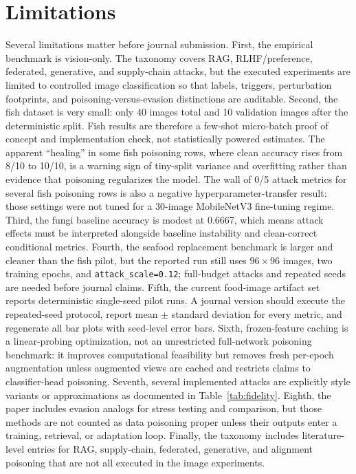 \documentclass[conference]{IEEEtran}
\begin{document}
\section{Limitations}

Several limitations matter before journal submission. First, the empirical benchmark is vision-only. The taxonomy covers RAG, RLHF/preference, federated, generative, and supply-chain attacks, but the executed experiments are limited to controlled image classification so that labels, triggers, perturbation footprints, and poisoning-versus-evasion distinctions are auditable. Second, the fish dataset is very small: only 40 images total and 10 validation images after the deterministic split. Fish results are therefore a few-shot micro-batch proof of concept and implementation check, not statistically powered estimates. The apparent ``healing'' in some fish poisoning rows, where clean accuracy rises from 8/10 to 10/10, is a warning sign of tiny-split variance and overfitting rather than evidence that poisoning regularizes the model. The wall of 0/5 attack metrics for several fish poisoning rows is also a negative hyperparameter-transfer result: those settings were not tuned for a 30-image MobileNetV3 fine-tuning regime. Third, the fungi baseline accuracy is modest at 0.6667, which means attack effects must be interpreted alongside baseline instability and clean-correct conditional metrics. Fourth, the seafood replacement benchmark is larger and cleaner than the fish pilot, but the reported run still uses \(96\times96\) images, two training epochs, and \texttt{attack\_scale=0.12}; full-budget attacks and repeated seeds are needed before journal claims. Fifth, the current food-image artifact set reports deterministic single-seed pilot runs. A journal version should execute the repeated-seed protocol, report mean \(\pm\) standard deviation for every metric, and regenerate all bar plots with seed-level error bars. Sixth, frozen-feature caching is a linear-probing optimization, not an unrestricted full-network poisoning benchmark: it improves computational feasibility but removes fresh per-epoch augmentation unless augmented views are cached and restricts claims to classifier-head poisoning. Seventh, several implemented attacks are explicitly style variants or approximations as documented in Table~\ref{tab:fidelity}. Eighth, the paper includes evasion analogs for stress testing and comparison, but those methods are not counted as data poisoning proper unless their outputs enter a training, retrieval, or adaptation loop. Finally, the taxonomy includes literature-level entries for RAG, supply-chain, federated, generative, and alignment poisoning that are not all executed in the image experiments.
\end{document}
